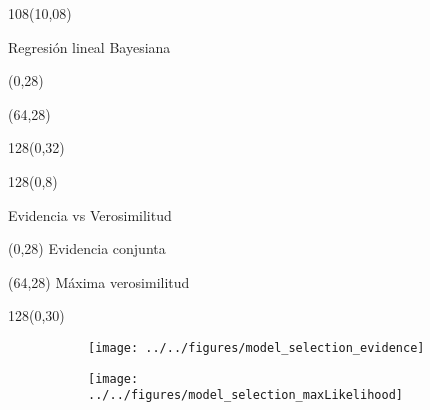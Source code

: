 \documentclass[shownotes]{beamer}
\begin{document}
\begin{frame}
\begin{textblock}{108}(10,08)
 \begin{center}
  \large Regresi\'on lineal Bayesiana
 \end{center}
\end{textblock}


\begin{textblock}{64}(0,28)
 \centering
\end{textblock}

\begin{textblock}{64}(64,28)
 \centering
\end{textblock}

\begin{textblock}{128}(0,32)
     \centering 
\end{textblock}

\end{frame}

\begin{frame}
\begin{textblock}{128}(0,8)
\begin{center}
 Evidencia vs Verosimilitud
\end{center}
\end{textblock}



\begin{textblock}{64}(0,28)
 \centering
Evidencia conjunta
\end{textblock}

\begin{textblock}{64}(64,28)
 \centering
 M\'axima verosimilitud
\end{textblock}


\begin{textblock}{128}(0,30)
     \centering 
       \begin{figure}[H]     
     \centering 
     \begin{subfigure}[b]{0.47\textwidth}
       \texttt{[image: ../../figures/model\_selection\_evidence]}
     \end{subfigure}
     \begin{subfigure}[b]{0.49\textwidth}
       \texttt{[image: ../../figures/model\_selection\_maxLikelihood]}
     \end{subfigure}
\end{figure}
\end{textblock}


\end{frame}
\end{document}
